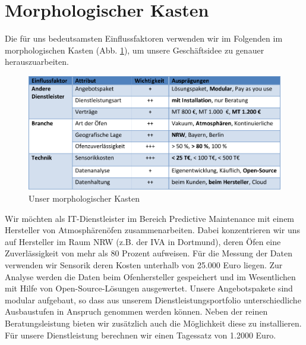 \section{Morphologischer Kasten}
Die für uns bedeutsamsten Einflussfaktoren verwenden wir im Folgenden im morphologischen Kasten (Abb. \ref{fig:MorphologischerKasten}), um unsere Geschäftsidee zu genauer herauszuarbeiten.

\begin{figure}[H]
\centering
\includegraphics[width=0.9\linewidth]{Bilder/MorphologischerKasten}
\caption{Unser morphologischer Kasten}
\label{fig:MorphologischerKasten}
\end{figure}

Wir möchten als IT-Dienstleister im Bereich Predictive Maintenance mit einem Hersteller von Atmosphärenöfen zusammenarbeiten. Dabei konzentrieren wir uns auf Hersteller im Raum NRW (z.B. der IVA in Dortmund), deren Öfen eine Zuverlässigkeit von mehr als 80 Prozent aufweisen. Für die Messung der Daten verwenden wir Sensorik deren Kosten unterhalb von 25.000 Euro liegen. Zur Analyse werden die Daten beim Ofenhersteller gespeichert und im Wesentlichen mit Hilfe von Open-Source-Lösungen ausgewertet. Unsere Angebotspakete sind modular aufgebaut, so dass aus unserem Dienstleistungsportfolio unterschiedliche Ausbaustufen in Anspruch genommen werden können. Neben der reinen Beratungsleistung bieten wir zusätzlich auch die Möglichkeit diese zu installieren. Für unsere Dienstleistung berechnen wir einen Tagessatz von 1.2000 Euro.
